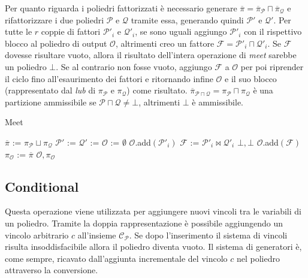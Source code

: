 \documentclass{mimosis}
\theoremstyle{definition}
\begin{document}
Per quanto riguarda i poliedri fattorizzati è necessario generare
\(\overline{\pi} = \overline{\pi}_{\mathcal{P}} \sqcap
\overline{\pi}_{\mathcal{Q}}\) e rifattorizzare i due poliedri \(\mathcal{P}\) e
\(\mathcal{Q}\) tramite essa, generando quindi \(\mathcal{P}'\) e \(\mathcal{Q}'\).
Per tutte le \(r\) coppie di fattori \(\mathcal{P}'_i\) e \(\mathcal{Q}'_i\), se
sono uguali aggiungo \(\mathcal{P}'_i\) con il rispettivo blocco al poliedro di
output \(\mathcal{O}\), altrimenti creo un fattore \(\mathcal{F} = \mathcal{P}'_i
\sqcap \mathcal{Q}'_i\). Se \(\mathcal{F}\) dovesse risultare vuoto, allora il
risultato dell'intera operazione di \emph{meet} sarebbe un poliedro \(\bot\). Se al
contrario non fosse vuoto, aggiungo \(\mathcal{F}\) a \(\mathcal{O}\) per poi
riprender il ciclo fino all'esaurimento dei fattori e ritornando infine
\(\mathcal{O}\) e il suo blocco (rappresentato dal \emph{lub} di \(\pi_{\mathcal{P}}\) e
\(\pi_{\mathcal{Q}}\)) come risultato. \(\overline{\pi}_{\mathcal{P} \sqcap
\mathcal{Q}} = \pi_{\mathcal{P}} \sqcap \pi_{\mathcal{Q}}\) è una partizione
ammissibile se \(\mathcal{P} \sqcap \mathcal{Q} \ne \bot\), altrimenti \(\bot\) è
ammissibile.

\begin{algorithm}[H]
\caption{Meet}\label{meet}
\begin{algorithmic}[1]
\State$\overline{\pi}$ := $\pi_{\mathcal{P}} \sqcup \pi_{\mathcal{Q}}$
\State$\mathcal{P}'$ := 
\State$\mathcal{Q}'$ := 
\State$\mathcal{O}$ := $\emptyset$
\State$\mathcal{O}$.add$(\mathcal{P}'_i)$
\Else
\State$\mathcal{F}$ := $\mathcal{P}'_{i} \bowtie \mathcal{Q}'_{i}$
\State\Return$\bot, \bot$
\EndIf
\State$\mathcal{O}$.add$(\mathcal{F})$
\EndIf
\EndFor
\State$\pi_{\mathcal{O}}$ := $\overline{\pi}$
\State\Return$\mathcal{O}, \pi_{\mathcal{O}}$
\EndFunction
\end{algorithmic}
\end{algorithm}


\subsection{Conditional}
\label{sec:org2b2f7b0}
Questa operazione viene utilizzata per aggiungere nuovi vincoli tra le variabili
di un poliedro. Tramite la doppia rappresentazione è possibile aggiungendo un
vincolo arbitrario \(c\) all'insieme \(\mathcal{C}_{\mathcal{P}}\). Se dopo
l'inserimento il sistema di vincoli risulta insoddisfacibile allora il poliedro
diventa vuoto. Il sistema di generatori è, come sempre, ricavato dall'aggiunta
incrementale del vincolo \(c\) nel poliedro attraverso la conversione.
\end{document}
